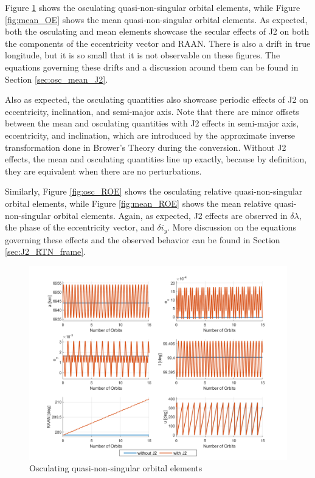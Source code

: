 Figure \ref{fig:osc_OE} shows the osculating quasi-non-singular orbital elements, while Figure \ref{fig:mean_OE} shows the mean quasi-non-singular orbital elements. As expected, both the osculating and mean elements showcase the secular effects of J2 on both the components of the eccentricity vector and RAAN. There is also a drift in true longitude, but it is so small that it is not observable on these figures. The equations governing these drifts and a discussion around them can be found in Section \ref{sec:osc_mean_J2}.

Also as expected, the osculating quantities also showcase periodic effects of J2 on eccentricity, inclination, and semi-major axis. Note that there are minor offsets between the mean and osculating quantities with J2 effects in semi-major axis, eccentricity, and inclination, which are introduced by the approximate inverse transformation done in Brower's Theory during the conversion. Without J2 effects, the mean and osculating quantities line up exactly, because by definition, they are equivalent when there are no perturbations. 

Similarly, Figure \ref{fig:osc_ROE} shows the osculating relative quasi-non-singular orbital elements, while Figure \ref{fig:mean_ROE} shows the mean relative quasi-non-singular orbital elements. Again, as expected, J2 effects are observed in $\delta \lambda$, the phase of the eccentricity vector, and $\delta i_y$. More discussion on the equations governing these effects and the observed behavior can be found in Section \ref{sec:J2_RTN_frame}.

\begin{figure}[H]
    \centering
    \includegraphics[width=0.75\linewidth]{sim/figures/PS4/OE_abs_osc_SV2.png}
    \caption{Osculating quasi-non-singular orbital elements}
    \label{fig:osc_OE}
\end{figure}

